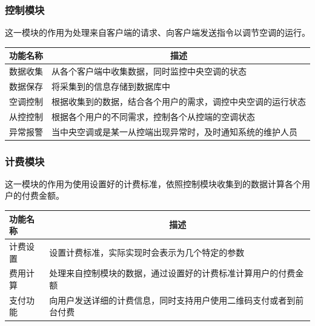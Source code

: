 \documentclass[blue,normal,cn]{elegantnote}
\begin{document}
\subsubsection{控制模块}
这一模块的作用为处理来自客户端的请求、向客户端发送指令以调节空调的运行。

\begin{center}
	\begin{tabular}{|>{\centering}m{}|m{}|}
		\hline
		\textbf{功能名称} & \multicolumn{1}{c|}{\textbf{描述}}                           \\
		\hline
		数据收集          & 从各个客户端中收集数据，同时监控中央空调的状态               \\
		\hline
		数据保存          & 将采集到的信息存储到数据库中                                 \\
		\hline
		空调控制          & 根据收集到的数据，结合各个用户的需求，调控中央空调的运行状态 \\
		\hline
		从控控制          & 根据各个用户的不同需求，控制各个从控端的空调状态             \\
		\hline
		异常报警          & 当中央空调或是某一从控端出现异常时，及时通知系统的维护人员   \\
		\hline
	\end{tabular}
\end{center}

\subsubsection{计费模块}
这一模块的作用为使用设置好的计费标准，依照控制模块收集到的数据计算各个用户的付费金额。

\begin{center}
	\begin{tabular}{|>{\centering}m{}|m{}|}
		\hline
		\textbf{功能名称} & \multicolumn{1}{c|}{\textbf{描述}}                                 \\
		\hline
		计费设置          & 设置计费标准，实际实现时会表示为几个特定的参数                     \\
		\hline
		费用计算          & 处理来自控制模块的数据，通过设置好的计费标准计算用户的付费金额     \\
		\hline
		支付功能          & 向用户发送详细的计费信息，同时支持用户使用二维码支付或者到前台付费 \\
		\hline
	\end{tabular}
\end{center}
\end{document}
